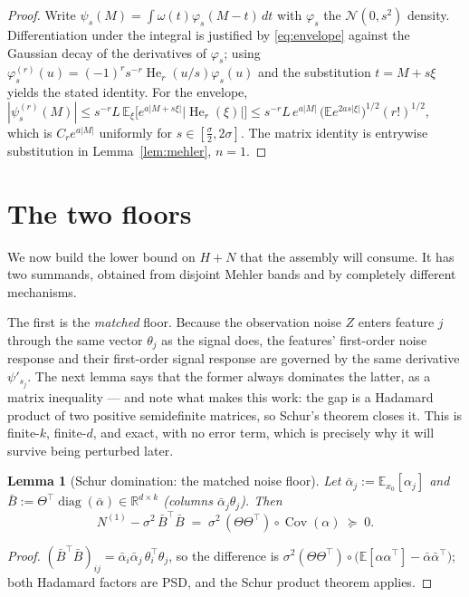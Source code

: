 \documentclass[11pt]{article}
\newtheorem{lemma}{Lemma}
\theoremstyle{remark}
\newcommand{\E}{\mathbb{E}}
\newcommand{\R}{\mathbb{R}}
\newcommand{\Cov}{\operatorname{Cov}}
\newcommand{\diag}{\operatorname{diag}}
\newcommand{\He}{\operatorname{He}}
\begin{document}
\begin{proof}
Write $\psi_s(M) = \int \omega(t)\varphi_s(M - t)\,dt$ with $\varphi_s$ the $\mathcal N(0,s^2)$ density. Differentiation under the integral is justified by \eqref{eq:envelope} against the Gaussian decay of the derivatives of $\varphi_s$; using $\varphi_s^{(r)}(u) = (-1)^r s^{-r}\He_r(u/s)\varphi_s(u)$ and the substitution $t = M + s\xi$ yields the stated identity. For the envelope, $|\psi_s^{(r)}(M)| \le s^{-r}L\,\E_\xi\big[e^{a|M+s\xi|}|\He_r(\xi)|\big] \le s^{-r}L\,e^{a|M|}\,\big(\E e^{2as|\xi|}\big)^{1/2}(r!)^{1/2}$, which is $C_r e^{a|M|}$ uniformly for $s \in [\tfrac\sigma2, 2\sigma]$. The matrix identity is entrywise substitution in Lemma~\ref{lem:mehler}, $n=1$.
\end{proof}

\section{The two floors}\label{sec:pillars}

We now build the lower bound on $H + N$ that the assembly will consume. It has two summands, obtained from disjoint Mehler bands and by completely different mechanisms.

The first is the \emph{matched} floor. Because the observation noise $Z$ enters feature $j$ through the same vector $\theta_j$ as the signal does, the features' first-order noise response and their first-order signal response are governed by the same derivative $\psi'_{s_j}$. The next lemma says that the former always dominates the latter, as a matrix inequality --- and note what makes this work: the gap is a Hadamard product of two positive semidefinite matrices, so Schur's theorem closes it. This is finite-$k$, finite-$d$, and exact, with no error term, which is precisely why it will survive being perturbed later.

\begin{lemma}[Schur domination: the matched noise floor]\label{lem:schur}
Let $\bar\alpha_j := \E_{x_0}[\alpha_j]$ and $\bar B := \Theta^\top\diag(\bar\alpha) \in \R^{d\times k}$ (columns $\bar\alpha_j\theta_j$). Then
\[
N^{(1)} - \sigma^2\,\bar B^\top\bar B \;=\; \sigma^2\,(\Theta\Theta^\top)\circ\Cov(\alpha) \;\succeq\; 0 .
\]
\end{lemma}

\begin{proof}
$(\bar B^\top \bar B)_{ij} = \bar\alpha_i\bar\alpha_j\,\theta_i^\top\theta_j$, so the difference is $\sigma^2(\Theta\Theta^\top)\circ\big(\E[\alpha\alpha^\top] - \bar\alpha\bar\alpha^\top\big)$; both Hadamard factors are PSD, and the Schur product theorem applies.
\end{proof}
\end{document}
